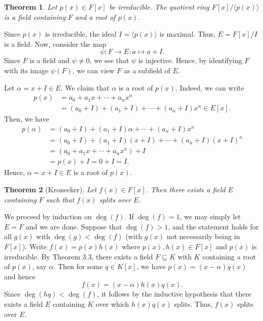 \documentclass[10pt]{article}
\makeatletter
\theoremstyle{newstyle}
\newtheorem{thm}{Theorem}[section]
\newenvironment{pf}[1][\proofname]{\par
  \pushQED{\qed}%
  \normalfont \topsep0\p@\relax
  \trivlist
  \item[\hskip\labelsep\scshape
  #1\@addpunct{.}]\ignorespaces
}{%
  \popQED\endtrivlist\@endpefalse
}
\makeatother
\begin{document}
\begin{thm}
Let $p(x) \in F[x]$ be irreducible. The quotient ring $F[x]/\langle p(x) \rangle$ is a field 
containing $F$ and a root of $p(x)$.
\end{thm}
\begin{pf}
Since $p(x)$ is irreducible, the ideal $I = \langle p(x) \rangle$ is maximal. Thus, 
$E = F[x]/I$ is a field. Now, consider the map 
\[ \psi : F \to E : a \mapsto a + I. \]
Since $F$ is a field and $\psi \neq 0$, we see that $\psi$ is injective. Hence, by identifying 
$F$ with its image $\psi(F)$, we can view $F$ as a subfield of $E$. 

Let $\alpha = x + I \in E$. We claim that $\alpha$ is a root of $p(x)$. Indeed, we can write 
\begin{align*}
    p(x) &= a_0 + a_1x + \cdots + a_n x^n \\
    &= (a_0 + I) + (a_1 + I) + \cdots + (a_n + I)x^n \in E[x]. 
\end{align*}
Then, we have 
\begin{align*}
    p(\alpha) &= (a_0 + I) + (a_1 + I)\alpha + \cdots + (a_n + I)x^n \\
    &= (a_0 + I) + (a_1 + I)(x + I) + \cdots + (a_n + I)(x + I)^n \\
    &= (a_0 + a_1x + \cdots + a_n x^n) + I \\
    &= p(x) + I = 0 + I = I.
\end{align*}
Hence, $\alpha = x+I \in E$ is a root of $p(x)$.
\end{pf}

\begin{thm}[Kronecker]
Let $f(x) \in F[x]$. Then there exists a field $E$ containing $F$ such that $f(x)$ splits over $E$.
\end{thm}
\begin{pf}
We proceed by induction on $\deg(f)$. If $\deg(f) = 1$, we may simply let $E = F$ and we are done. 
Suppose that $\deg(f) > 1$, and the statement holds for all $g(x)$ with $\deg(g) < \deg(f)$ 
(with $g(x)$ not necessarily being in $F[x]$). Write $f(x) = p(x)h(x)$ where 
$p(x), h(x) \in F[x]$ and $p(x)$ is irreducible. By Theorem 3.3, there exists a field 
$F \subseteq K$ with $K$ containing a root of $p(x)$, say $\alpha$. Then 
for some $q \in K[x]$, we have $p(x) = (x - \alpha) q(x)$ and hence 
\[ f(x) = (x-\alpha) h(x) q(x). \]
Since $\deg(hq) < \deg(f)$, it follows by the inductive hypothesis that there exists a field 
$E$ containing $K$ over which $h(x)q(x)$ splits. Thus, $f(x)$ splits over $E$.
\end{pf}
\end{document}
